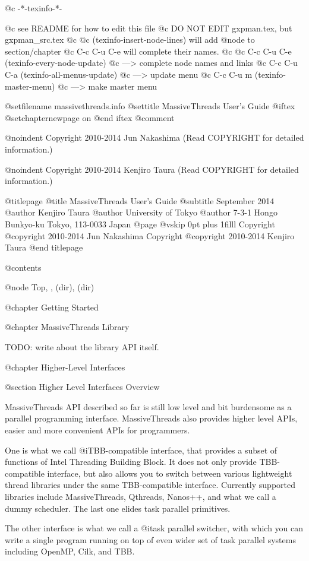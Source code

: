   @c -*-texinfo-*-

@c see README for how to edit this file
@c DO NOT EDIT gxpman.tex, but gxpman_src.tex
@c
@c (texinfo-insert-node-lines) will add @node to section/chapter
@c C-c C-u C-e will complete their names.
@c 
@c C-c C-u C-e  (texinfo-every-node-update) 
@c    ---> complete node names and links
@c C-c C-u C-a  (texinfo-all-menus-update)  
@c    ---> update menu
@c C-c C-u m    (texinfo-master-menu) 
@c    ---> make master menu

@setfilename massivethreads.info
@settitle MassiveThreads User's Guide
@iftex
@setchapternewpage on
@end iftex
@comment %


@noindent Copyright 2010-2014 Jun Nakashima (Read COPYRIGHT for detailed information.)

@noindent Copyright 2010-2014 Kenjiro Taura (Read COPYRIGHT for detailed information.)

@titlepage
@title MassiveThreads User's Guide
@subtitle September 2014
@author Kenjiro Taura
@author University of Tokyo
@author 7-3-1 Hongo Bunkyo-ku Tokyo, 113-0033 Japan
@page
@vskip 0pt plus 1filll
Copyright @copyright{} 2010-2014 Jun Nakashima
Copyright @copyright{} 2010-2014 Kenjiro Taura
@end titlepage

@contents

@node Top, , (dir), (dir)

@chapter Getting Started

@chapter MassiveThreads Library

TODO: write about the library API itself.

@chapter Higher-Level Interfaces

@section Higher Level Interfaces Overview

MassiveThreads API described so far is still low level and bit
burdensome as a parallel programming interface.  MassiveThreads also
provides higher level APIs, easier and more convenient APIs for
programmers.

One is what we call @i{TBB-compatible interface}, that provides a subset
of functions of Intel Threading Building Block.  It does not only
provide TBB-compatible interface, but also allows you to switch between
various lightweight thread libraries under the same TBB-compatible
interface.  Currently supported libraries include MassiveThreads,
Qthreads, Nanos++, and what we call a dummy scheduler.  The last one
elides task parallel primitives.

The other interface is what we call a @i{task parallel switcher}, with
which you can write a single program running on top of even wider set of
task parallel systems including OpenMP, Cilk, and TBB.

